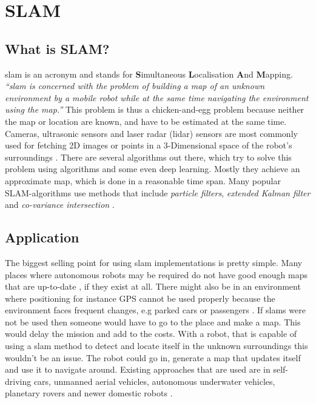 
\chapter{SLAM\authorA}

\section{What is SLAM?}
\gls{slam} is an acronym and stands for \textbf{S}imultaneous \textbf{L}ocalisation \textbf{A}nd \textbf{M}apping.
\emph{\enquote{\gls{slam} is concerned with the problem of building a map of an unknown environment by a mobile robot while at the same time navigating the environment using the map.}} \cite{slamfordummies} \newline
This problem is thus a chicken-and-egg problem because neither the map or location are known, and have to be estimated at the same time. Cameras, ultrasonic sensors and laser radar (\gls{lidar}) sensors are most commonly used for fetching 2D images or points in a 3-Dimensional space of the robot's surroundings \cite{arreverie}. \newline
There are several algorithms out there, which try to solve this problem using algorithms and some even deep learning. Mostly they achieve an approximate map, which is done in a reasonable time span. Many popular SLAM-algorithms use methods that include \textit{particle filters}, \textit{extended Kalman filter} and \textit{co-variance intersection}\cite{slamfordummies} \cite{1678144}. \newline

\section{Application}
The biggest selling point for using \gls{slam} implementations is pretty simple. Many places where autonomous robots may be required do not have good enough maps that are up-to-date , if they exist at all. There might also be in an environment where positioning for instance GPS cannot be used properly because the environment faces frequent changes, e.g parked cars or passengers \cite{techapeekslam}.  If \gls{slam}s were not be used then someone would have to go to the place and make a map. This would delay the mission and add to the costs. \newline
With a robot, that is capable of using a \gls{slam} method to detect and locate itself in the unknown surroundings this wouldn't be an issue. The robot could go in, generate a map that updates itself and use it to navigate around. \newline
Existing approaches that are used are in self-driving cars, unmanned aerial vehicles, autonomous underwater vehicles, planetary rovers and newer domestic robots \cite{usescasesforslam}.

